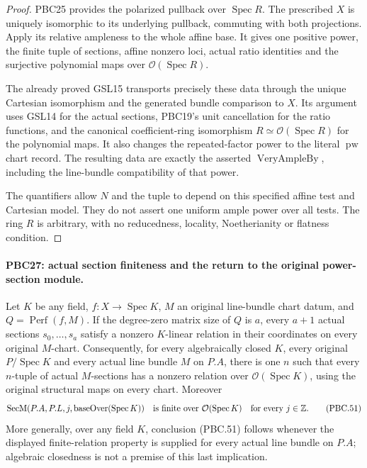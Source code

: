 \documentclass[11pt,a4paper]{article}
\numberwithin{equation}{section}
\theoremstyle{remark}\newtheorem{remark}[theorem]{Remark}
\begin{document}
\begin{proof}
PBC25 provides the polarized pullback over
$\operatorname{Spec}R$.  The prescribed $X$ is uniquely
isomorphic to its underlying pullback, commuting with both
projections.  Apply its relative ampleness to the whole affine
base.  It gives one positive power, the finite tuple of
sections, affine nonzero loci, actual ratio identities and
the surjective polynomial maps over
$\mathcal O(\operatorname{Spec}R)$.

The already proved GSL15 transports precisely these data
through the unique Cartesian isomorphism and the generated
bundle comparison to $X$.  Its argument uses GSL14 for
the actual sections, PBC19's unit cancellation for the
ratio functions, and the canonical coefficient-ring
isomorphism $R\simeq\mathcal O(\operatorname{Spec}R)$ for
the polynomial maps.  It also changes the repeated-factor
power to the literal $\operatorname{pw}$ chart record.
The resulting data are exactly the asserted
$\operatorname{VeryAmpleBy}$, including the line-bundle
compatibility of that power.

The quantifiers allow $N$ and the tuple to depend on this
specified affine test and Cartesian model.  They do not
assert one uniform ample power over all tests.
The ring $R$ is arbitrary, with no reducedness, locality,
Noetherianity or flatness condition.
\end{proof}

\paragraph{PBC27: actual section finiteness and the return to the original power-section module.}
\label{claim:PBC27}
Let $K$ be any field, $f:X\to\operatorname{Spec}K$, $M$
an original line-bundle chart datum, and
$Q=\operatorname{Perf}(f,M)$.
If the degree-zero matrix size of $Q$ is $a$, every
$a+1$ actual sections $s_0,\ldots,s_a$ satisfy a nonzero
$K$-linear relation in their coordinates on every original
$M$-chart.
Consequently, for every algebraically closed $K$, every
original $P/\operatorname{Spec}K$ and every actual line
bundle $M$ on $P.A$, there is one $n$ such that every
$n$-tuple of actual $M$-sections has a nonzero relation
over $\mathcal O(\operatorname{Spec}K)$, using the original
structural maps on every chart.  Moreover
\[
 \operatorname{SecM}(P.A,P.L,j,\operatorname{baseOver}(\operatorname{Spec}K))
 \quad\hbox{is finite over }\mathcal O(\operatorname{Spec}K)
       \quad\hbox{for every }j\in\mathbb Z.
                                                        \tag{PBC.51}
\]
More generally, over any field $K$, conclusion (PBC.51)
follows whenever the displayed finite-relation property is
supplied for every actual line bundle on $P.A$; algebraic
closedness is not a premise of this last implication.
\end{document}
